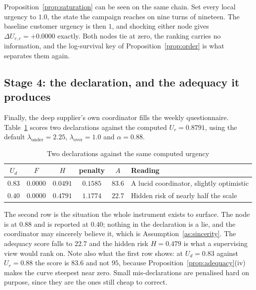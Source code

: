 Proposition~\ref{prop:saturation} can be seen on the same chain. Set every local urgency to
$1.0$, the state the campaign reaches on nine turns of nineteen. The baseline customer
urgency is then $1$, and shocking either node gives $\Delta U_{r,c} = +0.0000$ exactly. Both
nodes tie at zero, the ranking carries no information, and the log-survival key of
Proposition~\ref{prop:order} is what separates them again.

\subsection{Stage 4: the declaration, and the adequacy it produces}

Finally, the deep supplier's own coordinator fills the weekly questionnaire.
Table~\ref{tab:worked_adequacy} scores two declarations against the computed
$U_{r} = 0.8791$, using the default $\lambda_{\text{under}} = 2.25$,
$\lambda_{\text{over}} = 1.0$ and $\alpha = 0.88$.

\begin{table}[htbp]
\centering
\caption[Worked example: adequacy]{Two declarations against the same computed urgency}
\label{tab:worked_adequacy}
\small
\begin{tabularx}{\linewidth}{@{}c c c c c X@{}}
\toprule
\textbf{$U_d$} & \textbf{$F$} & \textbf{$H$} & \textbf{penalty} & \textbf{$A$} &
\textbf{Reading} \\
\midrule
$0.83$ & $0.0000$ & $0.0491$ & $0.1585$ & $83.6$ & A lucid coordinator, slightly optimistic \\
$0.40$ & $0.0000$ & $0.4791$ & $1.1774$ & $22.7$ & Hidden risk of nearly half the scale \\
\bottomrule
\end{tabularx}
\end{table}

The second row is the situation the whole instrument exists to surface. The node is at
$0.88$ and is reported at $0.40$; nothing in the declaration is a lie, and the coordinator
may sincerely believe it, which is Assumption~\ref{as:sincerity}. The adequacy score falls to $22.7$ and the hidden risk
$H = 0.479$ is what a supervising view would rank on. Note also what the first row shows: at
$U_d = 0.83$ against $U_r = 0.88$ the score is $83.6$ and not $95$, because
Proposition~\ref{prop:adequacy}(iv) makes the curve steepest near zero. Small
mis-declarations are penalised hard on purpose, since they are the ones still cheap to
correct.
